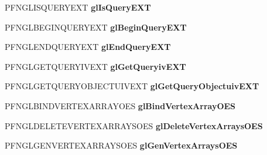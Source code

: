 \begin{DoxyCompactItemize}
\item 
\hypertarget{class_c_p_v_r_tgles2_ext_a82c9d5355d17ca3412efe8a085799faf}{P\+F\+N\+G\+L\+I\+S\+Q\+U\+E\+R\+Y\+E\+X\+T {\bfseries gl\+Is\+Query\+E\+X\+T}}\label{class_c_p_v_r_tgles2_ext_a82c9d5355d17ca3412efe8a085799faf}

\item 
\hypertarget{class_c_p_v_r_tgles2_ext_a8b83eb3904f474dfa6fb5bf1bc6c4df8}{P\+F\+N\+G\+L\+B\+E\+G\+I\+N\+Q\+U\+E\+R\+Y\+E\+X\+T {\bfseries gl\+Begin\+Query\+E\+X\+T}}\label{class_c_p_v_r_tgles2_ext_a8b83eb3904f474dfa6fb5bf1bc6c4df8}

\item 
\hypertarget{class_c_p_v_r_tgles2_ext_a3f7cd9da989941345f9162d155612eba}{P\+F\+N\+G\+L\+E\+N\+D\+Q\+U\+E\+R\+Y\+E\+X\+T {\bfseries gl\+End\+Query\+E\+X\+T}}\label{class_c_p_v_r_tgles2_ext_a3f7cd9da989941345f9162d155612eba}

\item 
\hypertarget{class_c_p_v_r_tgles2_ext_abd920ea8b6acb8dbbf2ecae263373f6d}{P\+F\+N\+G\+L\+G\+E\+T\+Q\+U\+E\+R\+Y\+I\+V\+E\+X\+T {\bfseries gl\+Get\+Queryiv\+E\+X\+T}}\label{class_c_p_v_r_tgles2_ext_abd920ea8b6acb8dbbf2ecae263373f6d}

\item 
\hypertarget{class_c_p_v_r_tgles2_ext_abe1f321718b8c126b659e9d0881a29b5}{P\+F\+N\+G\+L\+G\+E\+T\+Q\+U\+E\+R\+Y\+O\+B\+J\+E\+C\+T\+U\+I\+V\+E\+X\+T {\bfseries gl\+Get\+Query\+Objectuiv\+E\+X\+T}}\label{class_c_p_v_r_tgles2_ext_abe1f321718b8c126b659e9d0881a29b5}

\item 
\hypertarget{class_c_p_v_r_tgles2_ext_ab74b17ef2e65c1d43862f63450c2f1ce}{P\+F\+N\+G\+L\+B\+I\+N\+D\+V\+E\+R\+T\+E\+X\+A\+R\+R\+A\+Y\+O\+E\+S {\bfseries gl\+Bind\+Vertex\+Array\+O\+E\+S}}\label{class_c_p_v_r_tgles2_ext_ab74b17ef2e65c1d43862f63450c2f1ce}

\item 
\hypertarget{class_c_p_v_r_tgles2_ext_ab01fcdf9ac9cdd8452e04758ef2afe80}{P\+F\+N\+G\+L\+D\+E\+L\+E\+T\+E\+V\+E\+R\+T\+E\+X\+A\+R\+R\+A\+Y\+S\+O\+E\+S {\bfseries gl\+Delete\+Vertex\+Arrays\+O\+E\+S}}\label{class_c_p_v_r_tgles2_ext_ab01fcdf9ac9cdd8452e04758ef2afe80}

\item 
\hypertarget{class_c_p_v_r_tgles2_ext_ad0138ed776309bf1ef52a5ceaed223bb}{P\+F\+N\+G\+L\+G\+E\+N\+V\+E\+R\+T\+E\+X\+A\+R\+R\+A\+Y\+S\+O\+E\+S {\bfseries gl\+Gen\+Vertex\+Arrays\+O\+E\+S}}\label{class_c_p_v_r_tgles2_ext_ad0138ed776309bf1ef52a5ceaed223bb}


\end{DoxyCompactItemize}
